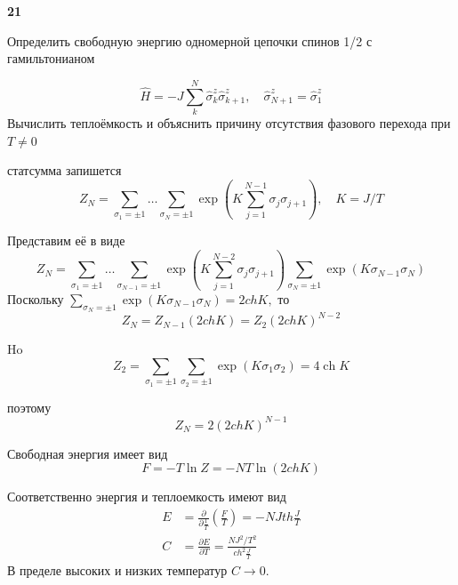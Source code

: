 \documentclass[a4paper,12pt]{article} %
\begin{document}
\begin{ttask} \textbf{21}

Определить свободную энергию одномерной цепочки спинов 1/2 с гамильтонианом

$$\hat{H}
=
-J \sum_{k}^{N} \hat{\sigma}_{k}^{z} \hat{\sigma}_{k+1}^{z}, \quad \hat{\sigma}_{N+1}^{z}
=
\hat{\sigma}_{1}^{z}$$
Вычислить теплоёмкость и объяснить причину отсутствия фазового перехода при $ T\ne 0 $




статсумма запишется
$$
Z_{N}=
\sum_{\sigma_{1}=\pm 1} \ldots \sum_{\sigma_{N}=\pm 1} 
\exp 
\left(K \sum_{j=1}^{N-1} \sigma_{j} \sigma_{j+1}\right), 
\quad
K=J / T
$$


Представим её в виде
$$
Z_{N}=\sum_{\sigma_{1}=\pm 1} \ldots \sum_{\sigma_{N-1}=\pm 1} \exp \left(K \sum_{j=1}^{N-2} \sigma_{j} \sigma_{j+1}\right) \sum_{\sigma_{N}=\pm 1} \exp \left(K \sigma_{N-1} \sigma_{N}\right)
$$
Поскольку 
$\sum_{\sigma_{N}=\pm 1} 
\exp \left(K \sigma_{N-1} \sigma_{N}\right)
=2  ch K,$ 
то
$$
Z_{N}=Z_{N-1}(2 c h K)=Z_{2}(2 c h K)^{N-2}
$$



Ho
$$
Z_{2}=\sum_{\sigma_{1}=\pm 1} \sum_{\sigma_{2}=\pm 1} \exp \left(K \sigma_{1} \sigma_{2}\right)=4 \operatorname{ch} K
$$

поэтому
$$
Z_{N}=2(2 c h K)^{N-1}
$$



Свободная энергия имеет вид
$$
F=-T \ln Z=-N T \ln (2 c h K)
$$




Соответственно энергия и теплоемкость имеют вид
$$
\begin{aligned}
	E &=\frac{\partial}{\partial \frac{1}{T}}\left(\frac{F}{T}\right)=-N J t h \frac{J}{T} \\
	C &=\frac{\partial E}{\partial T}=\frac{N J^{2} / T^{2}}{c h^{2} \frac{J}{T}}
\end{aligned}
$$
В пределе высоких и низких температур $C \rightarrow 0 .$







\end{ttask}
\end{document}
